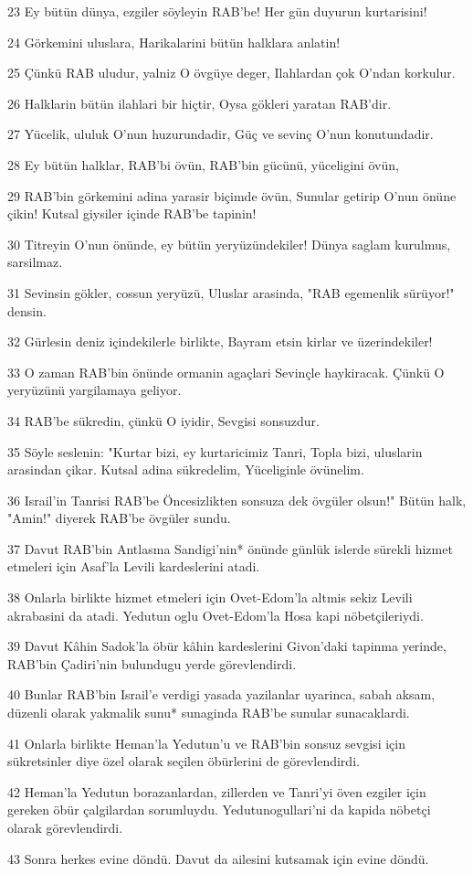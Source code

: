 \par 23 Ey bütün dünya, ezgiler söyleyin RAB'be! Her gün duyurun kurtarisini!
\par 24 Görkemini uluslara, Harikalarini bütün halklara anlatin!
\par 25 Çünkü RAB uludur, yalniz O övgüye deger, Ilahlardan çok O'ndan korkulur.
\par 26 Halklarin bütün ilahlari bir hiçtir, Oysa gökleri yaratan RAB'dir.
\par 27 Yücelik, ululuk O'nun huzurundadir, Güç ve sevinç O'nun konutundadir.
\par 28 Ey bütün halklar, RAB'bi övün, RAB'bin gücünü, yüceligini övün,
\par 29 RAB'bin görkemini adina yarasir biçimde övün, Sunular getirip O'nun önüne çikin! Kutsal giysiler içinde RAB'be tapinin!
\par 30 Titreyin O'nun önünde, ey bütün yeryüzündekiler! Dünya saglam kurulmus, sarsilmaz.
\par 31 Sevinsin gökler, cossun yeryüzü, Uluslar arasinda, "RAB egemenlik sürüyor!" densin.
\par 32 Gürlesin deniz içindekilerle birlikte, Bayram etsin kirlar ve üzerindekiler!
\par 33 O zaman RAB'bin önünde ormanin agaçlari Sevinçle haykiracak. Çünkü O yeryüzünü yargilamaya geliyor.
\par 34 RAB'be sükredin, çünkü O iyidir, Sevgisi sonsuzdur.
\par 35 Söyle seslenin: "Kurtar bizi, ey kurtaricimiz Tanri, Topla bizi, uluslarin arasindan çikar. Kutsal adina sükredelim, Yüceliginle övünelim.
\par 36 Israil'in Tanrisi RAB'be Öncesizlikten sonsuza dek övgüler olsun!" Bütün halk, "Amin!" diyerek RAB'be övgüler sundu.
\par 37 Davut RAB'bin Antlasma Sandigi'nin* önünde günlük islerde sürekli hizmet etmeleri için Asaf'la Levili kardeslerini atadi.
\par 38 Onlarla birlikte hizmet etmeleri için Ovet-Edom'la altmis sekiz Levili akrabasini da atadi. Yedutun oglu Ovet-Edom'la Hosa kapi nöbetçileriydi.
\par 39 Davut Kâhin Sadok'la öbür kâhin kardeslerini Givon'daki tapinma yerinde, RAB'bin Çadiri'nin bulundugu yerde görevlendirdi.
\par 40 Bunlar RAB'bin Israil'e verdigi yasada yazilanlar uyarinca, sabah aksam, düzenli olarak yakmalik sunu* sunaginda RAB'be sunular sunacaklardi.
\par 41 Onlarla birlikte Heman'la Yedutun'u ve RAB'bin sonsuz sevgisi için sükretsinler diye özel olarak seçilen öbürlerini de görevlendirdi.
\par 42 Heman'la Yedutun borazanlardan, zillerden ve Tanri'yi öven ezgiler için gereken öbür çalgilardan sorumluydu. Yedutunogullari'ni da kapida nöbetçi olarak görevlendirdi.
\par 43 Sonra herkes evine döndü. Davut da ailesini kutsamak için evine döndü.

